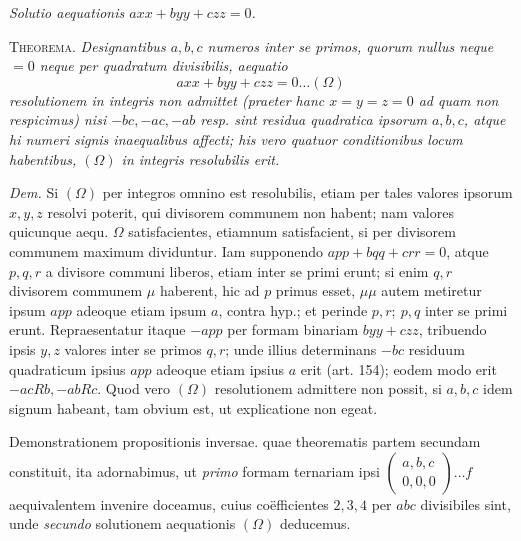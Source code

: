 \begin{center}\textit{Solutio aequationis \(axx+byy+czz=0\).}\end{center}
\textsc{Theorema.} \textit{Designantibus \(a,b,c\) numeros inter se primos, quorum nullus neque \(=0\) neque per quadratum divisibilis, aequatio}
\[
axx+byy+czz=0\ldots(\Omega)
\]
\textit{resolutionem in integris non admittet (praeter hanc \(x=y=z=0\) ad quam non respicimus) nisi \(-bc,-ac,-ab\) resp. sint residua quadratica ipsorum \(a,b,c\), atque hi numeri signis inaequalibus affecti; his vero quatuor conditionibus locum habentibus, \((\Omega)\) in integris resolubilis erit.}

\textit{Dem.} Si \((\Omega)\) per integros omnino est resolubilis, etiam per tales valores ipsorum \(x,y,z\) resolvi poterit, qui divisorem communem non habent; nam valores quicunque aequ. \(\Omega\) satisfacientes, etiamnum satisfacient, si per divisorem communem maximum dividuntur. Iam supponendo \(app+bqq+crr=0\), atque \(p,q,r\) a divisore communi liberos, etiam inter se primi erunt; si enim \(q,r\) divisorem communem \(\mu\) haberent, hic ad \(p\) primus esset, \(\mu\mu\) autem metiretur ipsum \(app\) adeoque etiam ipsum \(a\), contra hyp.; et perinde \(p,r;\ p,q\) inter se primi erunt. Repraesentatur itaque \(-app\) per formam binariam \(byy+czz\),
tribuendo ipsis \(y,z\) valores inter se primos \(q,r\); unde illius determinans \(-bc\) residuum quadraticum ipsius \(app\) adeoque etiam ipsius \(a\) erit (art. 154); eodem modo erit \(-acRb,-abRc\). Quod vero \((\Omega)\) resolutionem admittere non possit, si \(a,b,c\) idem signum habeant, tam obvium est, ut explicatione non egeat.

Demonstrationem propositionis inversae. quae theorematis partem secundam constituit, ita adornabimus, ut \textit{primo} formam ternariam ipsi \(\left(\begin{smallmatrix}a,b,c\\0,0,0\end{smallmatrix}\right)\ldots f\) aequivalentem invenire doceamus, cuius coëfficientes \(2,3,4\) per \(abc\) divisibiles sint, unde \textit{secundo} solutionem aequationis \((\Omega)\) deducemus.


